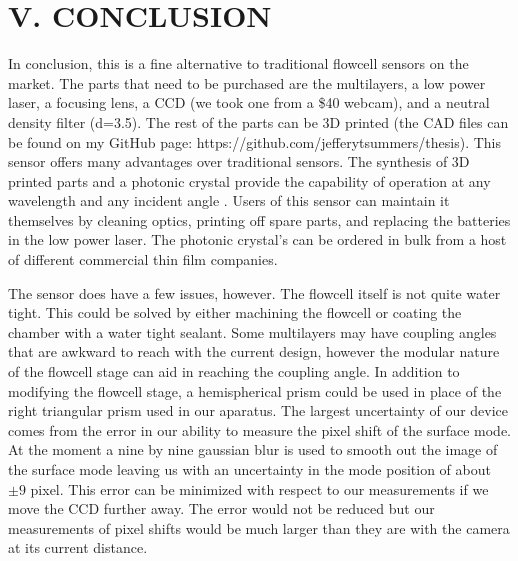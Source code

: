 \section*{\textbf{V. CONCLUSION}}
\hspace{0.25in}
In conclusion, this is a fine alternative to traditional flowcell sensors on the market. The parts that need to be purchased are the multilayers, a low power laser, a focusing lens, a CCD (we took one from a \$40 webcam), and a neutral density filter (d=3.5). The rest of the parts can be 3D printed (the CAD files can be found on my GitHub page: https://github.com/jefferytsummers/thesis). This sensor offers many advantages over traditional sensors. The synthesis of 3D printed parts and a photonic crystal provide the capability of operation at any wavelength and any incident angle \cite{farmer2012biosensing}. Users of this sensor can maintain it themselves by cleaning optics, printing off spare parts, and replacing the batteries in the low power laser. The photonic crystal's can be ordered in bulk from a host of different commercial thin film companies.

The sensor does have a few issues, however. The flowcell itself is not quite water tight. This could be solved by either machining the flowcell or coating the chamber with a water tight sealant. Some multilayers may have coupling angles that are awkward to reach with the current design, however the modular nature of the flowcell stage can aid in reaching the coupling angle. In addition to modifying the flowcell stage, a hemispherical prism could be used in place of the right triangular prism used in our aparatus. The largest uncertainty of our device comes from the error in our ability to measure the pixel shift of the surface mode. At the moment a nine by nine gaussian blur is used to smooth out the image of the surface mode leaving us with an uncertainty in the mode position of about $\pm 9$ pixel. This error can be minimized with respect to our measurements if we move the CCD further away. The error would not be reduced but our measurements of pixel shifts would be much larger than they are with the camera at its current distance.